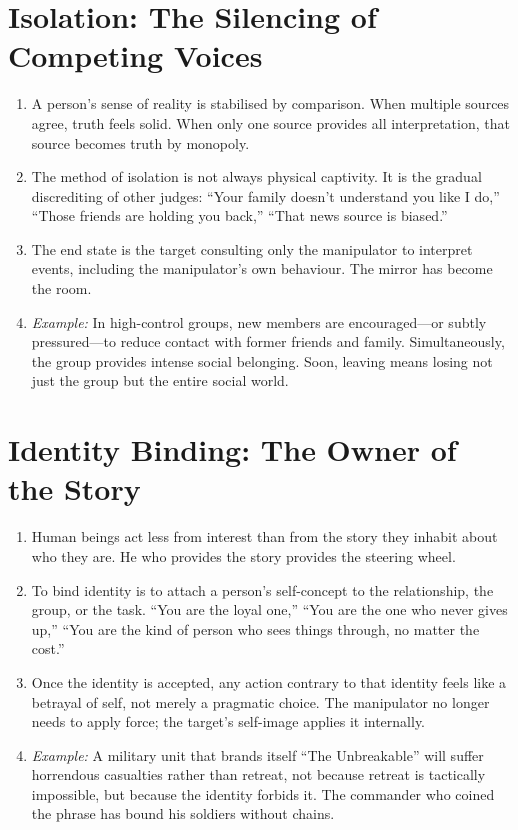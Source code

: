 \documentclass[12pt,a4paper,oneside]{book}
\begin{document}
\section{Isolation: The Silencing of Competing Voices}
\begin{enumerate}[leftmargin=*, label=\arabic*.]
\item A person's sense of reality is stabilised by comparison. When multiple sources agree, truth feels solid. When only one source provides all interpretation, that source becomes truth by monopoly.
\item The method of isolation is not always physical captivity. It is the gradual discrediting of other judges: “Your family doesn't understand you like I do,” “Those friends are holding you back,” “That news source is biased.”
\item The end state is the target consulting only the manipulator to interpret events, including the manipulator's own behaviour. The mirror has become the room.
\item \textit{Example:} In high-control groups, new members are encouraged—or subtly pressured—to reduce contact with former friends and family. Simultaneously, the group provides intense social belonging. Soon, leaving means losing not just the group but the entire social world.
\end{enumerate}

\section{Identity Binding: The Owner of the Story}
\begin{enumerate}[leftmargin=*, label=\arabic*.]
\item Human beings act less from interest than from the story they inhabit about who they are. He who provides the story provides the steering wheel.
\item To bind identity is to attach a person's self-concept to the relationship, the group, or the task. “You are the loyal one,” “You are the one who never gives up,” “You are the kind of person who sees things through, no matter the cost.”
\item Once the identity is accepted, any action contrary to that identity feels like a betrayal of self, not merely a pragmatic choice. The manipulator no longer needs to apply force; the target's self-image applies it internally.
\item \textit{Example:} A military unit that brands itself “The Unbreakable” will suffer horrendous casualties rather than retreat, not because retreat is tactically impossible, but because the identity forbids it. The commander who coined the phrase has bound his soldiers without chains.
\end{enumerate}
\end{document}
